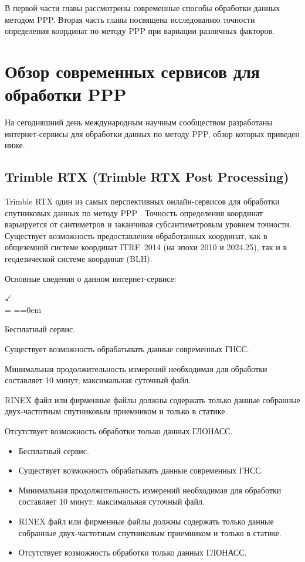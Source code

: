 В первой части главы рассмотрены современные способы обработки данных методом PPP. Вторая часть главы посвящена исследованию точности определения координат по методу PPP при вариации различных факторов.

\section{Обзор современных сервисов для обработки PPP}\label{sec:ch2/sec1}

На сегодняшний день международным научным сообществом разработаны интернет-сервисы для обработки данных по методу PPP, обзор которых приведен ниже.

\subsection{Trimble RTX (Trimble RTX Post Processing)}\label{subsec:ch2/sec1/sub1}

Trimble RTX один из самых перспективных онлайн-сервисов для обработки спутниковых данных по методу PPP \cite{src81}. Точность определения координат варьируется от сантиметров и заканчивая субсантиметровым уровнем точности. Существует возможность предоставления обработанных координат, как в общеземной системе координат ITRF~2014 (на эпохи 2010 и 2024.25), так и в геодезической системе координат (BLH).

Основные сведения о данном интернет-сервисе: 
\begin{list}{$ \checkmark $\\[6pt]} {\parsep = \parskip \itemsep=\parsep \topsep=0em}
	\item Бесплатный сервис. 
	\item Существует возможность обрабатывать данные современных ГНСС.
	\item Минимальная продолжительность измерений необходимая для обработки составляет 10 минут; максимальная суточный файл.
	\item RINEX файл или фирменные файлы должны содержать только данные собранные двух-частотным спутниковым приемником и только в статике.
	\item Отсутствует возможность обработки только данных ГЛОНАСС.
\end{list}

\begin{itemize}
	\item Бесплатный сервис. 
	\item Существует возможность обрабатывать данные современных ГНСС.
	\item Минимальная продолжительность измерений необходимая для обработки составляет 10 минут; максимальная суточный файл.
	\item RINEX файл или фирменные файлы должны содержать только данные собранные двух-частотным спутниковым приемником и только в статике.
	\item Отсутствует возможность обработки только данных ГЛОНАСС.
\end{itemize}

